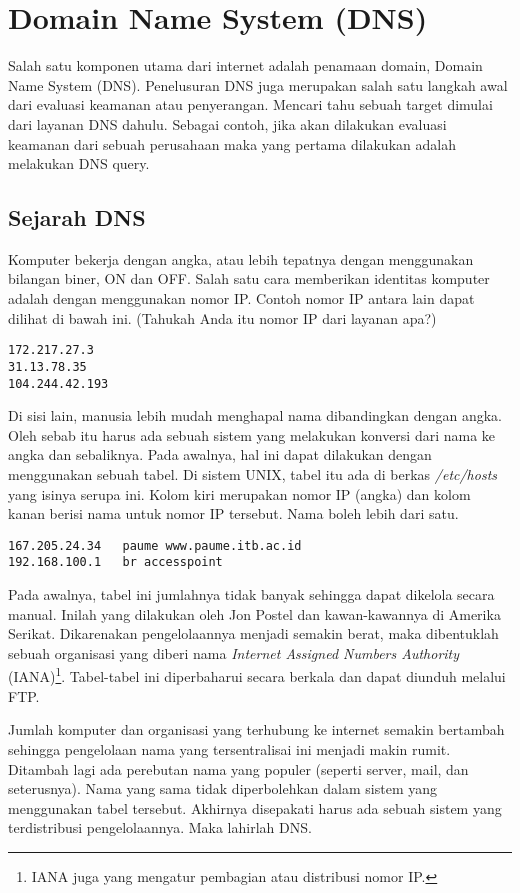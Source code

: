 \chapter{Domain Name System (DNS)}
Salah satu komponen utama dari internet adalah penamaan domain, Domain Name
System (DNS). Penelusuran DNS juga merupakan salah satu langkah awal dari
evaluasi keamanan atau penyerangan. Mencari tahu sebuah target dimulai dari
layanan DNS dahulu. Sebagai contoh, jika akan dilakukan evaluasi keamanan dari
sebuah perusahaan maka yang pertama dilakukan adalah melakukan DNS query.

\section{Sejarah DNS}
Komputer bekerja dengan angka, atau lebih tepatnya dengan menggunakan bilangan
biner, ON dan OFF. Salah satu cara memberikan identitas komputer adalah dengan
menggunakan nomor IP. Contoh nomor IP antara lain dapat dilihat di bawah ini.
(Tahukah Anda itu nomor IP dari layanan apa?)

\begin{verbatim}
172.217.27.3
31.13.78.35
104.244.42.193
\end{verbatim}

Di sisi lain, manusia lebih mudah menghapal nama dibandingkan dengan angka.
Oleh sebab itu harus ada sebuah sistem yang melakukan konversi dari nama ke
angka dan sebaliknya. Pada awalnya, hal ini dapat dilakukan dengan menggunakan
sebuah tabel. Di sistem UNIX, tabel itu ada di berkas {\em /etc/hosts} yang
isinya serupa ini. Kolom kiri merupakan nomor IP (angka) dan kolom kanan berisi
nama untuk nomor IP tersebut. Nama boleh lebih dari satu.

\begin{verbatim}
167.205.24.34   paume www.paume.itb.ac.id
192.168.100.1   br accesspoint
\end{verbatim}

Pada awalnya, tabel ini jumlahnya tidak banyak sehingga dapat dikelola secara
manual. Inilah yang dilakukan oleh Jon Postel dan kawan-kawannya di Amerika
Serikat. Dikarenakan pengelolaannya menjadi semakin berat, maka dibentuklah
sebuah organisasi yang diberi nama {\em Internet Assigned Numbers Authority}
(IANA)\footnote{IANA juga yang mengatur pembagian atau distribusi nomor IP.}.
Tabel-tabel ini diperbaharui secara berkala dan dapat diunduh melalui FTP.

Jumlah komputer dan organisasi yang terhubung ke internet semakin bertambah
sehingga pengelolaan nama yang tersentralisai ini menjadi makin rumit. Ditambah
lagi ada perebutan nama yang populer (seperti server, mail, dan seterusnya).
Nama yang sama tidak diperbolehkan dalam sistem yang menggunakan tabel
tersebut. Akhirnya disepakati harus ada sebuah sistem yang terdistribusi
pengelolaannya. Maka lahirlah DNS.


